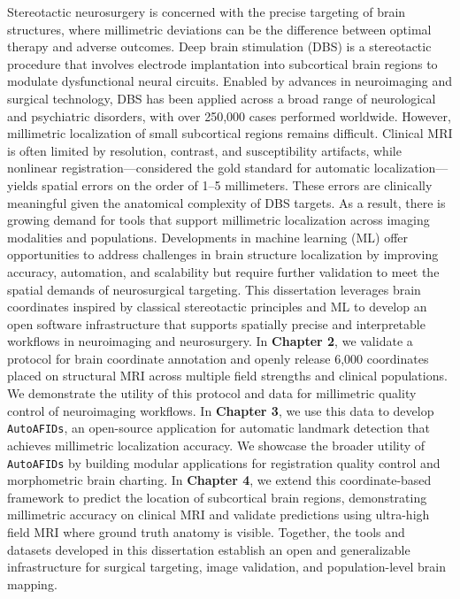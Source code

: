 \onehalfspacing
Stereotactic neurosurgery is concerned with the precise targeting of brain structures, where millimetric deviations can be the difference between optimal therapy and adverse outcomes. Deep brain stimulation (DBS) is a stereotactic procedure that involves electrode implantation into subcortical brain regions to modulate dysfunctional neural circuits. Enabled by advances in neuroimaging and surgical technology, DBS has been applied across a broad range of neurological and psychiatric disorders, with over 250,000 cases performed worldwide. However, millimetric localization of small subcortical regions remains difficult. Clinical MRI is often limited by resolution, contrast, and susceptibility artifacts, while nonlinear registration—considered the gold standard for automatic localization—yields spatial errors on the order of 1–5 millimeters. These errors are clinically meaningful given the anatomical complexity of DBS targets. As a result, there is growing demand for tools that support millimetric localization across imaging modalities and populations. Developments in machine learning (ML) offer opportunities to address challenges in brain structure localization by improving accuracy, automation, and scalability but require further validation to meet the spatial demands of neurosurgical targeting. This dissertation leverages brain coordinates inspired by classical stereotactic principles and ML to develop an open software infrastructure that supports spatially precise and interpretable workflows in neuroimaging and neurosurgery. In \textbf{Chapter 2}, we validate a protocol for brain coordinate annotation and openly release 6,000 coordinates placed on structural MRI across multiple field strengths and clinical populations. We demonstrate the utility of this protocol and data for millimetric quality control of neuroimaging workflows. In \textbf{Chapter 3}, we use this data to develop \texttt{AutoAFIDs}, an open-source application for automatic landmark detection that achieves millimetric localization accuracy. We showcase the broader utility of \texttt{AutoAFIDs} by building modular applications for registration quality control and morphometric brain charting. In \textbf{Chapter 4}, we extend this coordinate-based framework to predict the location of subcortical brain regions, demonstrating millimetric accuracy on clinical MRI and validate predictions using ultra-high field MRI where ground truth anatomy is visible. Together, the tools and datasets developed in this dissertation establish an open and generalizable infrastructure for surgical targeting, image validation, and population-level brain mapping.
